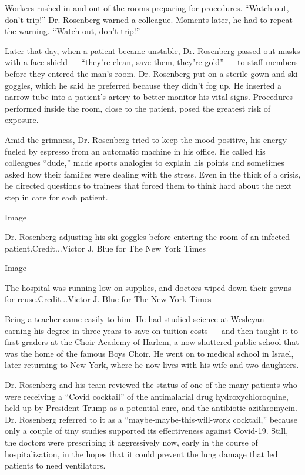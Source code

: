 Workers rushed in and out of the rooms preparing for procedures. ``Watch
out, don't trip!'' Dr. Rosenberg warned a colleague. Moments later, he
had to repeat the warning. ``Watch out, don't trip!''

Later that day, when a patient became unstable, Dr. Rosenberg passed out
masks with a face shield --- ``they're clean, save them, they're gold''
--- to staff members before they entered the man's room. Dr. Rosenberg
put on a sterile gown and ski goggles, which he said he preferred
because they didn't fog up. He inserted a narrow tube into a patient's
artery to better monitor his vital signs. Procedures performed inside
the room, close to the patient, posed the greatest risk of exposure.

Amid the grimness, Dr. Rosenberg tried to keep the mood positive, his
energy fueled by espresso from an automatic machine in his office. He
called his colleagues ``dude,'' made sports analogies to explain his
points and sometimes asked how their families were dealing with the
stress. Even in the thick of a crisis, he directed questions to trainees
that forced them to think hard about the next step in care for each
patient.

Image

Dr. Rosenberg adjusting his ski goggles before entering the room of an
infected patient.Credit...Victor J. Blue for The New York Times

Image

The hospital was running low on supplies, and doctors wiped down their
gowns for reuse.Credit...Victor J. Blue for The New York Times

Being a teacher came easily to him. He had studied science at Wesleyan
--- earning his degree in three years to save on tuition costs --- and
then taught it to first graders at the Choir Academy of Harlem, a now
shuttered public school that was the home of the famous Boys Choir. He
went on to medical school in Israel, later returning to New York, where
he now lives with his wife and two daughters.

Dr. Rosenberg and his team reviewed the status of one of the many
patients who were receiving a ``Covid cocktail'' of the antimalarial
drug hydroxychloroquine, held up by President Trump as a potential cure,
and the antibiotic azithromycin. Dr. Rosenberg referred to it as a
``maybe-maybe-this-will-work cocktail,'' because only a couple of tiny
studies supported its effectiveness against Covid-19. Still, the doctors
were prescribing it aggressively now, early in the course of
hospitalization, in the hopes that it could prevent the lung damage that
led patients to need ventilators.


